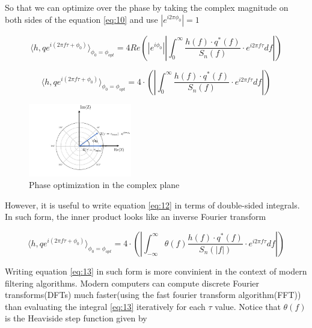 So that we can optimize over the phase by taking the complex magnitude on both sides of the equation \ref{eq:10} and use $\left|e^{i2\pi \phi_0}\right|=1$

\begin{equation}\label{eq:11}
\langle h,q e^{i(2\pi f \tau + \phi_0)} \rangle_{\phi_0=\phi_{opt}} =4 Re\left( \left|e^{i \phi_0}\right|  \left| \int_{0}^{\infty} \frac{h(f) \cdot q^{*}(f) }{S_n(f)} \cdot e^{i 2\pi f \tau} df \right| \right)
\end{equation}

\begin{equation}\label{eq:12}
\langle h,q e^{i(2\pi f \tau + \phi_0)} \rangle_{\phi_0=\phi_{opt}} =4\cdot \left( \left| \int_{0}^{\infty} \frac{h(f) \cdot q^{*}(f) }{S_n(f)} \cdot e^{i 2\pi f \tau} df \right| \right)
\end{equation}

\begin{figure}[hbt!]

\begin{center}

\includegraphics[width=0.4\textwidth, angle=0]{images/ph_opt.png}
\caption{Phase optimization in the complex plane}
\label{fig:6}
\end{center}
\end{figure}

\FloatBarrier

However, it is useful to write equation \ref{eq:12} in terms of double-sided integrals. In such form, the inner product looks like an inverse Fourier transform

\begin{equation}\label{eq:13}
\langle h,q e^{i(2\pi f \tau + \phi_0)} \rangle_{\phi_0=\phi_{opt}} =4\cdot \left( \left| \int_{-\infty}^{\infty} \theta(f)\frac{h(f) \cdot q^{*}(f) }{S_n(|f|)} \cdot e^{i 2\pi f \tau} df \right| \right)
\end{equation}


Writing equation \ref{eq:13} in such form is more convinient in the context of modern filtering algorithms. Modern computers can compute discrete Fourier transforms(DFTs) much faster(using the fast fourier transform algorithm(FFT)) than evaluating the integral \ref{eq:13} iteratively for each $\tau$ value. Notice that $\theta(f)$ is the Heaviside step function given by

